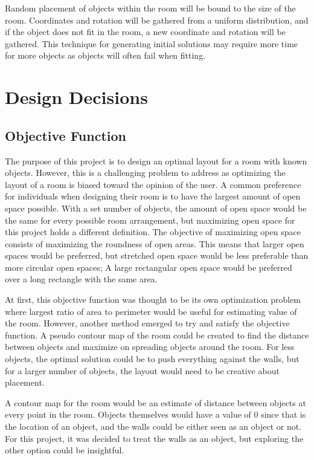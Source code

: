 \documentclass[sigconf,authordraft]{acmart}
\begin{document}
    Random placement of objects within the room will be bound to the size of the room. Coordinates and rotation will be gathered from a uniform distribution, and if the object does not fit in the room, a new coordinate and rotation will be gathered. This technique for generating initial solutions may require more time for more objects as objects will often fail when fitting.
    

\section{Design Decisions}
    \subsection{Objective Function}
    The purpose of this project is to design an optimal layout for a room with known objects. However, this is a challenging problem to address as optimizing the layout of a room is biased toward the opinion of the user. A common preference for individuals when designing their room is to have the largest amount of open space possible. With a set number of objects, the amount of open space would be the same for every possible room arrangement, but maximizing open space for this project holds a different definition. The objective of maximizing open space consists of maximizing the roundness of open areas. This means that larger open spaces would be preferred, but stretched open space would be less preferable than more circular open spaces; A large rectangular open space would be preferred over a long rectangle with the same area.
    
    At first, this objective function was thought to be its own optimization problem where largest ratio of area to perimeter would be useful for estimating value of the room. However, another method emerged to try and satisfy the objective function. A pseudo contour map of the room could be created to find the distance between objects and maximize on spreading objects around the room. For less objects, the optimal solution could be to push everything against the walls, but for a larger number of objects, the layout would need to be creative about placement.
    
    A contour map for the room would be an estimate of distance between objects at every point in the room. Objects themselves would have a value of 0 since that is the location of an object, and the walls could be either seen as an object or not. For this project, it was decided to treat the walls as an object, but exploring the other option could be insightful.
    
\end{document}
